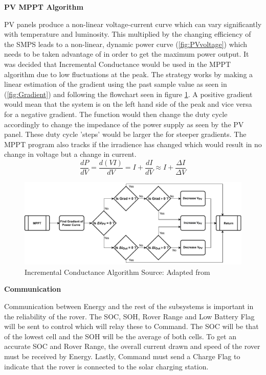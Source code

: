 \documentclass[10pt,twoside]{article}
\begin{document}
\textbf{PV MPPT Algorithm}

PV panels produce a non-linear voltage-current curve which can vary significantly with temperature and luminosity. This multiplied by the changing efficiency of the SMPS leads to a non-linear, dynamic power curve (\ref{fig:PVvoltage}) which needs to be taken advantage of in order to get the maximum power output. It was decided that Incremental Conductance would be used in the MPPT algorithm due to low fluctuations at the peak. The strategy works by making a linear estimation of the gradient using the past sample value as seen in (\ref{fig:Gradient}) and following the flowchart seen in figure \ref{fig:IncrementalConductance}. A positive gradient would mean that the system is on the left hand side of the peak and vice versa for a negative gradient. The function would then change the duty cycle accordingly to change the impedance of the power supply as seen by the PV panel. These duty cycle 'steps' would be larger the for steeper gradients. The MPPT program also tracks if the irradience has changed which would result in no change in voltage but a change in current. 
\begin{equation}
    \frac{dP}{dV} = \frac{d(VI)}{dV} = I + \frac{dI}{dV} \approx I + \frac{\Delta I}{\Delta V}
    \label{fig:Gradient}
\end{equation}

\begin{figure}[hbt!]
    \centering
    \includegraphics[scale = 0.6]{IncrementalConductance2 (3).pdf}
    \caption{Incremental Conductance Algorithm \quad Source: Adapted from \cite{Choudhary2014IncrementalConverter}}
    \label{fig:IncrementalConductance}
\end{figure}

\textbf{Communication}

Communication between Energy and the rest of the subsystems is important in the reliability of the rover. The SOC, SOH, Rover Range and Low Battery Flag will be sent to control which will relay these to Command. The SOC will be that of the lowest cell and the SOH will be the average of both cells. To get an accurate SOC and Rover Range, the overall current drawn and speed of the rover must be received by Energy. Lastly, Command must send a Charge Flag to indicate that the rover is connected to the solar charging station. 
\end{document}
